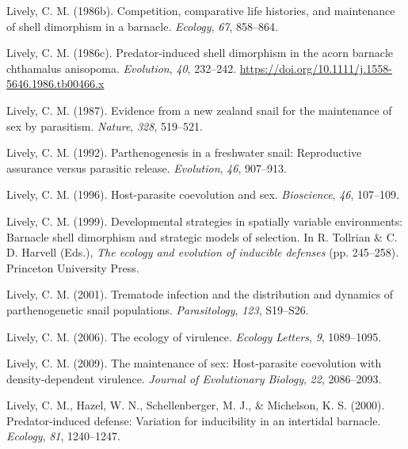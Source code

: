 \documentclass[
  letterpaper,
]{book}
\newlength{\cslhangindent}
\newlength{\cslentryspacingunit} %
\newenvironment{CSLReferences}[2] %
 {%
  \setlength{\parindent}{0pt}
  \ifodd #1
  \let\oldpar\par
  \def\par{\hangindent=\cslhangindent\oldpar}
  \fi
  \setlength{\parskip}{#2\cslentryspacingunit}
 }%
 {}
\begin{document}
\begin{CSLReferences}{1}{0}
\leavevmode{}%
Lively, C. M. (1986b). Competition, comparative life histories, and
maintenance of shell dimorphism in a barnacle. \emph{Ecology},
\emph{67}, 858--864.

\leavevmode{}%
Lively, C. M. (1986c). Predator-induced shell dimorphism in the acorn
barnacle chthamalus anisopoma. \emph{Evolution}, \emph{40}, 232--242.
\url{https://doi.org/10.1111/j.1558-5646.1986.tb00466.x}

\leavevmode{}%
Lively, C. M. (1987). Evidence from a new zealand snail for the
maintenance of sex by parasitism. \emph{Nature}, \emph{328}, 519--521.

\leavevmode{}%
Lively, C. M. (1992). Parthenogenesis in a freshwater snail:
Reproductive assurance versus parasitic release. \emph{Evolution},
\emph{46}, 907--913.

\leavevmode{}%
Lively, C. M. (1996). Host-parasite coevolution and sex.
\emph{Bioscience}, \emph{46}, 107--109.

\leavevmode{}%
Lively, C. M. (1999). Developmental strategies in spatially variable
environments: Barnacle shell dimorphism and strategic models of
selection. In R. Tollrian \& C. D. Harvell (Eds.), \emph{The ecology and
evolution of inducible defenses} (pp. 245--258). Princeton University
Press.

\leavevmode{}%
Lively, C. M. (2001). Trematode infection and the distribution and
dynamics of parthenogenetic snail populations. \emph{Parasitology},
\emph{123}, S19--S26.

\leavevmode{}%
Lively, C. M. (2006). The ecology of virulence. \emph{Ecology Letters},
\emph{9}, 1089--1095.

\leavevmode{}%
Lively, C. M. (2009). The maintenance of sex: Host-parasite coevolution
with density-dependent virulence. \emph{Journal of Evolutionary
Biology}, \emph{22}, 2086--2093.

\leavevmode{}%
Lively, C. M., Hazel, W. N., Schellenberger, M. J., \& Michelson, K. S.
(2000). Predator-induced defense: Variation for inducibility in an
intertidal barnacle. \emph{Ecology}, \emph{81}, 1240--1247.


\end{CSLReferences}
\end{document}
